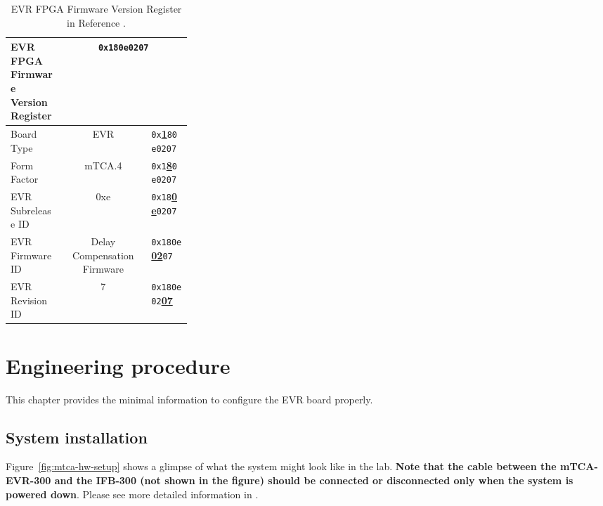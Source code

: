 \documentclass[11pt
  , a4paper
  , article
  , oneside
  , showtrims
]{memoir}
\begin{document}
\begin{table}[!htb]
  \centering
  \begin{tabular}{p{0.3\linewidth}|c|l}
    \toprule
    EVR FPGA Firmware Version Register              & \multicolumn{2}{c}{\texttt{0x180e0207}}             \\\midrule
    Board Type        & EVR                         &  \texttt{0x}\underline{\textbf{1}}\texttt{80e0207}  \\\midrule
    Form Factor       & mTCA.4                      &  \texttt{0x1}\underline{\textbf{8}}\texttt{0e0207}  \\\midrule
    EVR Subrelease ID & 0xe                         &  \texttt{0x18}\underline{\textbf{0e}}\texttt{0207}  \\\midrule
    EVR Firmware ID   & Delay Compensation Firmware &  \texttt{0x180e}\underline{\textbf{02}}\texttt{07}  \\\midrule
    EVR Revision ID   & 7                           &  \texttt{0x180e02}\underline{\textbf{07}}           \\\bottomrule
  \end{tabular}
  \caption[]{EVR FPGA Firmware Version Register in Reference \citep[see][p66]{MRFEVENTSYSTEMDC}.}
  \label{table:fwinfo}
\end{table}



\chapter{Engineering procedure}
This chapter provides the minimal information to configure the EVR board properly.\\


\section{System installation}
Figure~\ref{fig:mtca-hw-setup} shows a glimpse of what the system might look like in the lab. \textbf{Note that the cable between the mTCA-EVR-300 and the IFB-300 (not shown in the figure) should be connected or disconnected only when the system is powered down}. Please see more detailed information in \citep[][p54]{MRFEVENTSYSTEMDC}.\\
\end{document}

